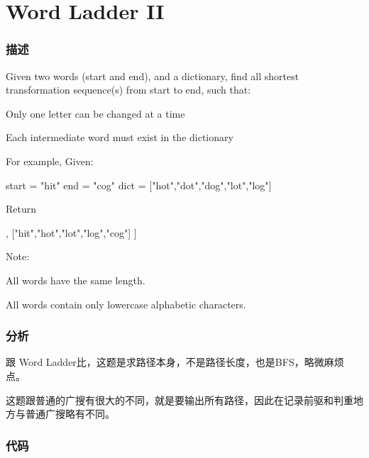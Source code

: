 \section{Word Ladder II} %
\label{sec:wordladderii}


\subsubsection{描述}
Given two words (start and end), and a dictionary, find all shortest transformation sequence(s) from start to end, such that:
\begindot
\item Only one letter can be changed at a time
\item Each intermediate word must exist in the dictionary
\myenddot

For example, Given:
\begin{Code}
start = "hit"
end = "cog"
dict = ["hot","dot","dog","lot","log"]
\end{Code}
Return
\begin{Code}
[
    ["hit","hot","dot","dog","cog"],
    ["hit","hot","lot","log","cog"]
]
\end{Code}

Note:
\begindot
\item All words have the same length.
\item All words contain only lowercase alphabetic characters.
\myenddot


\subsubsection{分析}
跟 Word Ladder比，这题是求路径本身，不是路径长度，也是BFS，略微麻烦点。

这题跟普通的广搜有很大的不同，就是要输出所有路径，因此在记录前驱和判重地方与普通广搜略有不同。


\subsubsection{代码}

